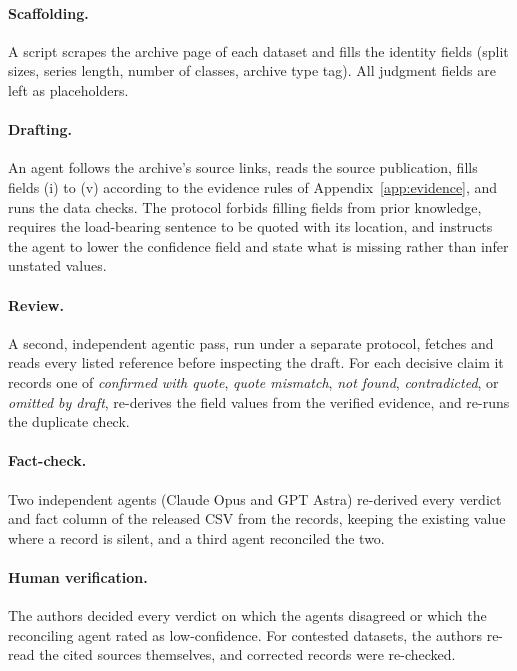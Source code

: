 \paragraph{Scaffolding.} A script scrapes the archive page of each dataset and fills the identity fields (split sizes, series length, number of classes, archive type tag). All judgment fields are left as placeholders.

\paragraph{Drafting.} An agent follows the archive's source links, reads the source publication, fills fields (i) to (v) according to the evidence rules of Appendix~\ref{app:evidence}, and runs the data checks. The protocol forbids filling fields from prior knowledge, requires the load-bearing sentence to be quoted with its location, and instructs the agent to lower the confidence field and state what is missing rather than infer unstated values.

\paragraph{Review.} A second, independent agentic pass, run under a separate protocol, fetches and reads every listed reference before inspecting the draft. For each decisive claim it records one of \emph{confirmed with quote}, \emph{quote mismatch}, \emph{not found}, \emph{contradicted}, or \emph{omitted by draft}, re-derives the field values from the verified evidence, and re-runs the duplicate check.

\paragraph{Fact-check.} Two independent agents (Claude Opus and GPT Astra) re-derived every verdict and fact column of the released CSV from the records, keeping the existing value where a record is silent, and a third agent reconciled the two.

\paragraph{Human verification.} The authors decided every verdict on which the agents disagreed or which the reconciling agent rated as low-confidence. For contested datasets, the authors re-read the cited sources themselves, and corrected records were re-checked.









